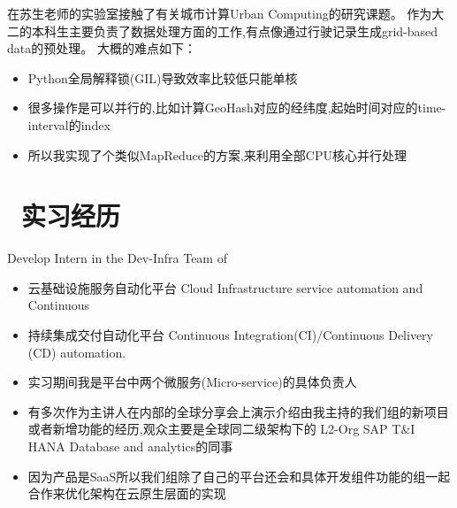\documentclass{resume}
\begin{document}



在苏生老师的实验室接触了有关城市计算Urban Computing的研究课题。
作为大二的本科生主要负责了数据处理方面的工作,有点像通过行驶记录生成grid-based data的预处理。
大概的难点如下：
\begin{itemize}
  \item Python全局解释锁(GIL)导致效率比较低只能单核
  \item 很多操作是可以并行的,比如计算GeoHash对应的经纬度,起始时间对应的time-interval的index
  \item 所以我实现了个类似MapReduce的方案,来利用全部CPU核心并行处理
\end{itemize}



\section{\faUsers\ 实习经历}
Develop Intern in the Dev-Infra Team of \href{https://www.sap.com/products/technology-platform/data-intelligence.html}{\color{blue}{SAP Data Intelligence}}
\begin{itemize}
  \item 云基础设施服务自动化平台 Cloud Infrastructure service automation and Continuous
  \item 持续集成交付自动化平台 Continuous Integration(CI)/Continuous Delivery (CD) automation.
  \item 实习期间我是平台中两个微服务(Micro-service)的具体负责人
  \item 有多次作为主讲人在内部的全球分享会上演示介绍由我主持的我们组的新项目或者新增功能的经历,观众主要是全球同二级架构下的 L2-Org SAP T\&I HANA Database and analytics的同事
  \item 因为产品是SaaS所以我们组除了自己的平台还会和具体开发组件功能的组一起合作来优化架构在云原生层面的实现
\end{itemize}
\end{document}
